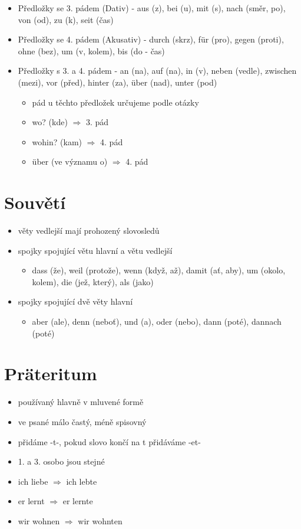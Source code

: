 \documentclass[a4paper,12pt]{report}
\begin{document}
\begin{itemize}
  \item Předložky se 3. pádem (Dativ) - aus (z), bei (u), mit (s), nach (směr, po), von (od), zu (k), seit (čas)
  \item Předložky se 4. pádem (Akusativ) - durch (skrz), für (pro), gegen (proti), ohne (bez), um (v, kolem), bis (do - čas)
  \item Předložky s 3. a 4. pádem - an (na), auf (na), in (v), neben (vedle), zwischen (mezi), vor (před), hinter (za), über (nad), unter (pod)
    \begin{itemize}
      \item pád u těchto předložek určujeme podle otázky
      \item wo? (kde) $\Rightarrow$ 3. pád
      \item wohin? (kam) $\Rightarrow$ 4. pád
      \item über (ve významu o) $\Rightarrow$ 4. pád
    \end{itemize}
\end{itemize}

\section{Souvětí}

\begin{itemize}
  \item věty vedlejší mají prohozený slovosledů
  \item spojky spojující větu hlavní a větu vedlejší
    \begin{itemize}
      \item  dass (že), weil (protože), wenn (když, až), damit (ať, aby), um (okolo, kolem), die (jež, který), als (jako)
    \end{itemize}
  \item spojky spojující dvě věty hlavní
    \begin{itemize}
      \item aber (ale), denn (neboť), und (a), oder (nebo), dann (poté), dannach (poté)
    \end{itemize}
\end{itemize}

\section{Präteritum}

\begin{itemize}
  \item používaný hlavně v mluvené formě
  \item ve psané málo častý, méně spisovný
  \item přidáme -t-, pokud slovo končí na t přidáváme -et-
  \item 1. a 3. osobo jsou stejné
  \item ich liebe $\Rightarrow$ ich lebte
  \item er lernt $\Rightarrow$ er lernte
  \item wir wohnen $\Rightarrow$ wir wohnten
\end{itemize}
\end{document}
